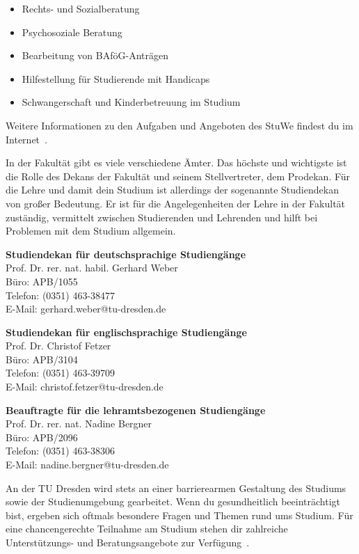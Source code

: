 \begin{itemize}
\item Rechts- und Sozialberatung
\item Psychosoziale Beratung
\item Bearbeitung von BAföG-Anträgen
\item Hilfestellung für Studierende mit Handicaps
\item Schwangerschaft und Kinderbetreuung im Studium
\end{itemize}

Weitere Informationen zu den Aufgaben und Angeboten des StuWe findest du im Internet~.

In der Fakultät gibt es viele verschiedene Ämter.
Das höchste und wichtigste ist die Rolle des Dekans der Fakultät und seinem Stellvertreter, dem Prodekan.
Für die Lehre und damit dein Studium ist allerdings der sogenannte Studiendekan von großer Bedeutung.
Er ist für die Angelegenheiten der Lehre in der Fakultät zuständig, vermittelt zwischen Studierenden und Lehrenden und hilft bei Problemen mit dem Studium allgemein.

\textbf{Studiendekan für deutschsprachige Studiengänge}\\
Prof. Dr. rer. nat. habil. Gerhard Weber \\
Büro: APB/1055 \\
Telefon: (0351) 463-38477 \\
E-Mail: gerhard.weber@tu-dresden.de

\textbf{Studiendekan für englischsprachige Studiengänge}\\
Prof. Dr. Christof Fetzer \\
Büro: APB/3104 \\
Telefon: (0351) 463-39709 \\
E-Mail: christof.fetzer@tu-dresden.de

\textbf{Beauftragte für die lehramtsbezogenen Studiengänge}\\
Prof. Dr. rer. nat. Nadine Bergner \\
Büro: APB/2096 \\
Telefon: (0351) 463-38306 \\
E-Mail: nadine.bergner@tu-dresden.de


An der TU Dresden wird stets an einer barrierearmen Gestaltung des Studiums sowie der Studienumgebung gearbeitet.
Wenn du gesundheitlich beeinträchtigt bist, ergeben sich oftmals besondere Fragen und Themen rund ums Studium.
Für eine chancengerechte Teilnahme am Studium stehen dir zahlreiche Unterstützungs- und Beratungsangebote zur Verfügung~.



